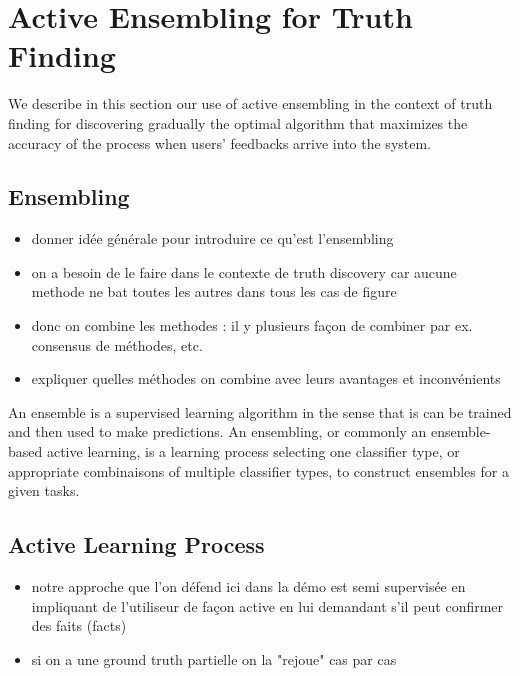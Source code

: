 \section{Active Ensembling for Truth Finding}
We describe in this section our use of active ensembling in the context of truth finding
for discovering gradually the optimal algorithm that maximizes the accuracy of the process
when users' feedbacks arrive into the system.

\subsection{Ensembling }
\begin{itemize}
\item donner idée générale pour introduire  ce qu'est l'ensembling
\item on a besoin de le faire dans le contexte de truth discovery car aucune methode ne bat toutes les autres dans tous les cas de figure
\item donc on combine les methodes : il y plusieurs façon de combiner par ex. consensus de méthodes, etc.
\item expliquer quelles méthodes on combine avec leurs avantages et inconvénients
\end{itemize}

An ensemble is a supervised learning algorithm in the sense that is can be trained and then used to make predictions.
An ensembling, or  commonly an ensemble-based active learning, is a learning process selecting one classifier type, or appropriate combinaisons 
of multiple classifier types, to construct ensembles for a given tasks.

\subsection{Active Learning Process}
\begin{itemize}
 \item notre approche que l'on défend ici dans la démo est  semi supervisée en impliquant de l'utiliseur de façon active
en lui demandant s'il peut confirmer des faits (facts)
\item si on a une ground truth partielle on la "rejoue" cas par cas
\end{itemize}

